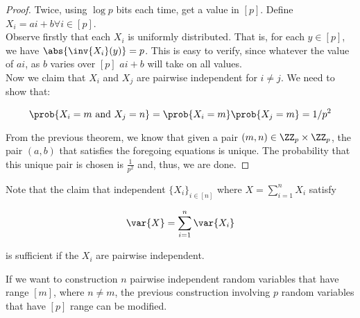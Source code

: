 \documentclass[../main.tex]{subfiles}
\begin{document}
\begin{proof}
    Twice, using $\log p$ bits each time, get a value in $[p]$. Define $X_{i} = ai + b \forall i \in [p]$. \\

    Observe firstly that each $X_{i}$ is uniformly distributed. That is, for each $y \in [p]$, we have $\abs{\inv{X_{i}}(y)} = p$. This is easy to verify, since whatever the value of $ai$, as $b$ varies over $[p]$ $ai + b$ will take on all values. \\

    Now we claim that $X_{i}$ and $X_{j}$ are pairwise independent for $i \not = j$. We need to show that:

    \[
        \prob{X_{i} = m \text{ and } X_{j} = n} = \prob{X_{i} = m}\prob{X_{j} = m} = 1/p^2
    \]

    From the previous theorem, we know that given a pair $(m,n) \in \ZZ_p \times \ZZ_p$, the pair $(a,b)$ that satisfies the foregoing equations is unique. The probability that this unique pair is chosen is $\frac{1}{p^2}$ and, thus, we are done.
\end{proof}

\begin{remark}
    Note that the claim that independent $\{X_{i}\}_{i \in [n]}$ where $X = \sum_{i=1}^{n}X_{i}$ satisfy

    \[
        \var{X} = \sum_{i=1}^{n}\var{X_{i}}
    \]

    is sufficient if the $X_{i}$ are pairwise independent.
\end{remark}

\begin{proposition}
    If we want to construction $n$ pairwise independent random variables that have range $[m]$, where $n \not = m$, the previous construction involving $p$ random variables that have $[p]$ range can be modified.
\end{proposition}
\end{document}
